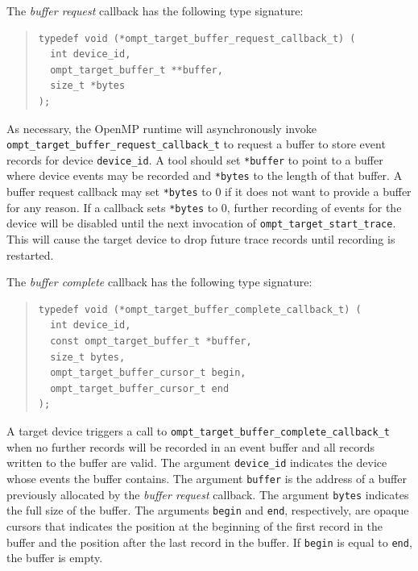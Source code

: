 \documentclass{article}
\begin{document}
The \emph{buffer request} callback has the following type signature:
\begin{quote}
\begin{verbatim}
typedef void (*ompt_target_buffer_request_callback_t) (
  int device_id,
  ompt_target_buffer_t **buffer,
  size_t *bytes
);
\end{verbatim}
\end{quote}
As necessary, the OpenMP runtime will asynchronously invoke \verb|ompt_target_buffer_request_callback_t| to request a buffer to store event records for device \verb|device_id|.
A tool should set \verb|*buffer| to point to a buffer where device events may be recorded and \verb|*bytes| to the length of that buffer.
A buffer request callback  may set \verb|*bytes| to 0 if it does not want to provide a buffer for any reason. If a callback sets \verb|*bytes| to 0, further recording of events for the device will be disabled until the next invocation of \verb|ompt_target_start_trace|. This will cause the target device to drop future trace records until recording is restarted.

The \emph{buffer complete} callback has the following type signature: 
\begin{quote}
\begin{verbatim}
typedef void (*ompt_target_buffer_complete_callback_t) (
  int device_id, 
  const ompt_target_buffer_t *buffer,
  size_t bytes,
  ompt_target_buffer_cursor_t begin,
  ompt_target_buffer_cursor_t end
);
\end{verbatim}
\end{quote}
A target device triggers a call to \verb|ompt_target_buffer_complete_callback_t| when no further records will be recorded in an event buffer and all records written to the buffer are valid. 
The argument \verb|device_id| indicates the device whose events the buffer contains. The argument \verb|buffer| is the address of a buffer previously allocated by the \emph{buffer request} callback. The argument \verb|bytes| indicates the full size of the buffer. The arguments \verb|begin| and \verb|end|, respectively, are opaque cursors that indicates the position at the beginning of the first record in the buffer and the position after the last record in the buffer. If \verb|begin| is equal to \verb|end|, the buffer is empty. 
\end{document}
